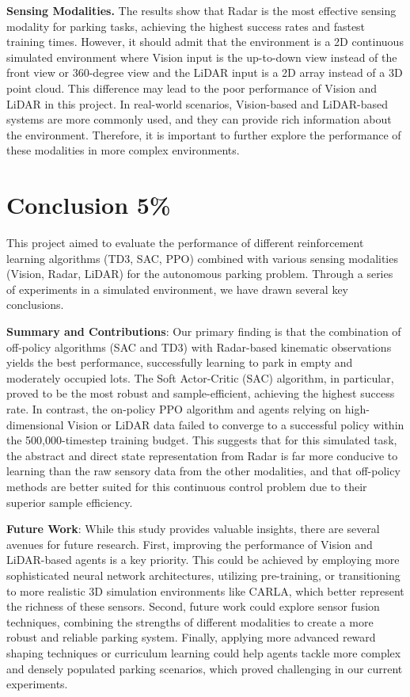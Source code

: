 \documentclass{article}
\begin{document}
\textbf{Sensing Modalities.} The results show that Radar is the most effective sensing modality for parking tasks, achieving the highest success rates and fastest training times. However, it should admit that the environment is a 2D continuous simulated environment where Vision input is the up-to-down view instead of the front view or 360-degree view and the LiDAR input is a 2D array instead of a 3D point cloud. This difference may lead to the poor performance of Vision and LiDAR in this project. In real-world scenarios, Vision-based and LiDAR-based systems are more commonly used, and they can provide rich information about the environment. Therefore, it is important to further explore the performance of these modalities in more complex environments.

\section{Conclusion 5\%}\label{sec:conclusion}

This project aimed to evaluate the performance of different reinforcement learning algorithms (TD3, SAC, PPO) combined with various sensing modalities (Vision, Radar, LiDAR) for the autonomous parking problem. Through a series of experiments in a simulated environment, we have drawn several key conclusions.

\textbf{Summary and Contributions}: Our primary finding is that the combination of off-policy algorithms (SAC and TD3) with Radar-based kinematic observations yields the best performance, successfully learning to park in empty and moderately occupied lots. The Soft Actor-Critic (SAC) algorithm, in particular, proved to be the most robust and sample-efficient, achieving the highest success rate. In contrast, the on-policy PPO algorithm and agents relying on high-dimensional Vision or LiDAR data failed to converge to a successful policy within the 500,000-timestep training budget. This suggests that for this simulated task, the abstract and direct state representation from Radar is far more conducive to learning than the raw sensory data from the other modalities, and that off-policy methods are better suited for this continuous control problem due to their superior sample efficiency.

\textbf{Future Work}: While this study provides valuable insights, there are several avenues for future research. First, improving the performance of Vision and LiDAR-based agents is a key priority. This could be achieved by employing more sophisticated neural network architectures, utilizing pre-training, or transitioning to more realistic 3D simulation environments like CARLA, which better represent the richness of these sensors. Second, future work could explore sensor fusion techniques, combining the strengths of different modalities to create a more robust and reliable parking system. Finally, applying more advanced reward shaping techniques or curriculum learning could help agents tackle more complex and densely populated parking scenarios, which proved challenging in our current experiments.
\end{document}
